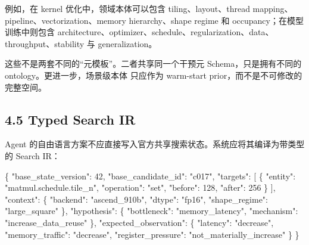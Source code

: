 \documentclass[
  11pt]{ctexart}
\newenvironment{Shaded}{}{}
\newcommand{\DataTypeTok}[1]{\textcolor[rgb]{0.56,0.13,0.00}{#1}}
\newcommand{\DecValTok}[1]{\textcolor[rgb]{0.25,0.63,0.44}{#1}}
\newcommand{\FunctionTok}[1]{\textcolor[rgb]{0.02,0.16,0.49}{#1}}
\newcommand{\OtherTok}[1]{\textcolor[rgb]{0.00,0.44,0.13}{#1}}
\newcommand{\StringTok}[1]{\textcolor[rgb]{0.25,0.44,0.63}{#1}}
\begin{document}
例如，在 kernel 优化中，领域本体可以包含 tiling、layout、thread
mapping、pipeline、vectorization、memory hierarchy、shape regime 和
occupancy；在模型训练中则包含
architecture、optimizer、schedule、regularization、data、throughput、stability
与 generalization。

这些不是两套不同的``元模板''。二者共享同一个干预元
Schema，只是拥有不同的 ontology。更进一步，场景级本体 只应作为
warm-start prior，而不是不可修改的完整空间。

\subsection{4.5 Typed Search IR}\label{typed-search-ir}

Agent
的自由语言方案不应直接写入官方共享搜索状态。系统应将其编译为带类型的
Search IR：

\begin{Shaded}
\begin{Highlighting}[]
\FunctionTok{\{}
  \DataTypeTok{"base\_state\_version"}\FunctionTok{:} \DecValTok{42}\FunctionTok{,}
  \DataTypeTok{"base\_candidate\_id"}\FunctionTok{:} \StringTok{"c017"}\FunctionTok{,}
  \DataTypeTok{"targets"}\FunctionTok{:} \OtherTok{[}
    \FunctionTok{\{}
      \DataTypeTok{"entity"}\FunctionTok{:} \StringTok{"matmul.schedule.tile\_n"}\FunctionTok{,}
      \DataTypeTok{"operation"}\FunctionTok{:} \StringTok{"set"}\FunctionTok{,}
      \DataTypeTok{"before"}\FunctionTok{:} \DecValTok{128}\FunctionTok{,}
      \DataTypeTok{"after"}\FunctionTok{:} \DecValTok{256}
    \FunctionTok{\}}
  \OtherTok{]}\FunctionTok{,}
  \DataTypeTok{"context"}\FunctionTok{:} \FunctionTok{\{}
    \DataTypeTok{"backend"}\FunctionTok{:} \StringTok{"ascend\_910b"}\FunctionTok{,}
    \DataTypeTok{"dtype"}\FunctionTok{:} \StringTok{"fp16"}\FunctionTok{,}
    \DataTypeTok{"shape\_regime"}\FunctionTok{:} \StringTok{"large\_square"}
  \FunctionTok{\},}
  \DataTypeTok{"hypothesis"}\FunctionTok{:} \FunctionTok{\{}
    \DataTypeTok{"bottleneck"}\FunctionTok{:} \StringTok{"memory\_latency"}\FunctionTok{,}
    \DataTypeTok{"mechanism"}\FunctionTok{:} \StringTok{"increase\_data\_reuse"}
  \FunctionTok{\},}
  \DataTypeTok{"expected\_observation"}\FunctionTok{:} \FunctionTok{\{}
    \DataTypeTok{"latency"}\FunctionTok{:} \StringTok{"decrease"}\FunctionTok{,}
    \DataTypeTok{"memory\_traffic"}\FunctionTok{:} \StringTok{"decrease"}\FunctionTok{,}
    \DataTypeTok{"register\_pressure"}\FunctionTok{:} \StringTok{"not\_materially\_increase"}
  \FunctionTok{\}}
\FunctionTok{\}}
\end{Highlighting}
\end{Shaded}
\end{document}
